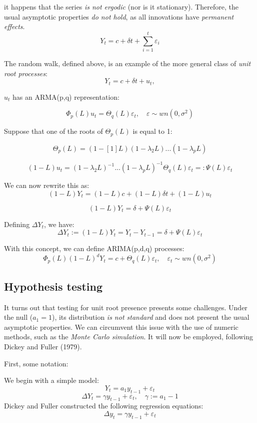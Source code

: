 \documentclass[11pt, a4paper]{report}
\theoremstyle{plain}
\theoremstyle{plain}
\theoremstyle{remark}
\begin{document}
it happens that the series \emph{is not ergodic} (nor is it stationary).
Therefore, the usual asymptotic properties \emph{do not hold}, as all
innovations have \emph{permanent effects}.
\[ Y_t = c + \delta t + \sum_{i=1}^t \varepsilon_i \]

The random walk, defined above, is an example of the more general class
of \emph{unit root processes}: \[ Y_t = c + \delta t + u_t,\]

\(u_t\) has an ARMA(p,q) representation:

\[ \Phi_p (L) u_t = \Theta_q (L) \varepsilon_t, \hspace{1em} \varepsilon \sim wn(0, \sigma^2)\]

Suppose that one of the roots of \(\Theta_p (L)\) is equal to 1:

\[ \Theta_p (L) = (1 - [1]L)(1 - \lambda_2 L)...(1 - \lambda_p L)\]

\[ (1 - L)u_t = (1 - \lambda_2 L)^{-1} ... (1 - \lambda_p L)^{-1} \Theta_q (L) \varepsilon_t =: \Psi(L) \varepsilon_t \]

We can now rewrite this as:
\[ (1- L)Y_t = (1-L)c + (1-L)\delta t + (1-L)u_t \]

\[ (1 - L)Y_t = \delta + \Psi (L) \varepsilon_t \]

Defining \(\Delta Y_t\), we have:
\[ \Delta Y_t := (1 - L)Y_t = Y_t - Y_{t-1} = \delta + \Psi (L) \varepsilon_t \]

With this concept, we can define ARIMA(p,d,q) processes:
\[ \Phi_p (L) (1-L)^d Y_t = c + \Theta_q (L) \varepsilon_t, \hspace{1em} \varepsilon_t \sim wn(0, \sigma^2) \]

\subsection{Hypothesis testing}

It turns out that testing for unit root presence presents some
challenges. Under the null (\(a_1 = 1\)), its distribution \emph{is not
standard} and does not present the usual asymptotic properties. We can
circumvent this issue with the use of numeric methods, such as the
\emph{Monte Carlo simulation}. It will now be employed, following Dickey
and Fuller (1979).

First, some notation:

We begin with a simple model: \[ Y_t = a_1 y_{t-1} + \varepsilon_t \]
\[ \Delta Y_t = \gamma y_{t-1} + \varepsilon_t, \hspace{1em} \gamma := a_1 - 1 \]
Dickey and Fuller constructed the following regression equations:
\begin{equation}
 \Delta y_t = \gamma y_{t-1} + \varepsilon_t
\end{equation}
\end{document}
